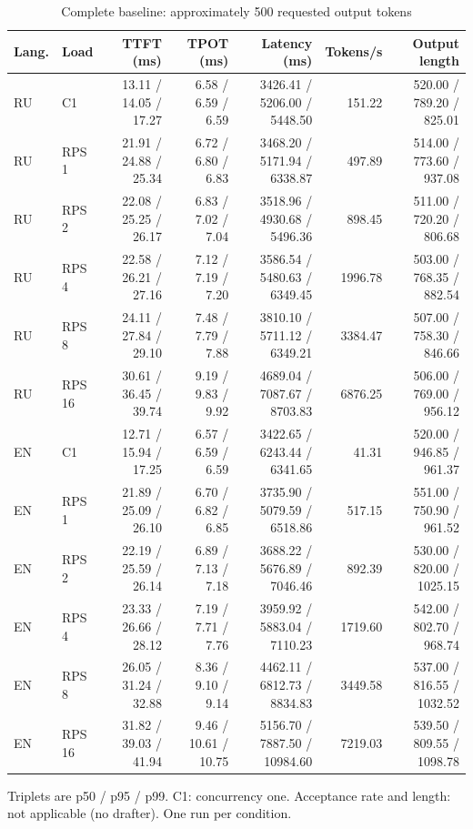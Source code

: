\begin{table}[htbp]
\centering
\caption{Complete baseline: approximately 500 requested output tokens}
\label{tab:full500}
\begin{singlespace}
\fontsize{10.5}{13}\selectfont
\setlength{\tabcolsep}{4pt}
\renewcommand{\arraystretch}{1.2}
\begin{tabular}{@{}llrrrrr@{}}
\toprule
Lang. & Load & TTFT (ms) & TPOT (ms) & Latency (ms) & Tokens/s & Output length \\
\midrule
RU & C1 & 13.11 / 14.05 / 17.27 & 6.58 / 6.59 / 6.59 & 3426.41 / 5206.00 / 5448.50 & 151.22 & 520.00 / 789.20 / 825.01 \\
RU & RPS 1 & 21.91 / 24.88 / 25.34 & 6.72 / 6.80 / 6.83 & 3468.20 / 5171.94 / 6338.87 & 497.89 & 514.00 / 773.60 / 937.08 \\
RU & RPS 2 & 22.08 / 25.25 / 26.17 & 6.83 / 7.02 / 7.04 & 3518.96 / 4930.68 / 5496.36 & 898.45 & 511.00 / 720.20 / 806.68 \\
RU & RPS 4 & 22.58 / 26.21 / 27.16 & 7.12 / 7.19 / 7.20 & 3586.54 / 5480.63 / 6349.45 & 1996.78 & 503.00 / 768.35 / 882.54 \\
RU & RPS 8 & 24.11 / 27.84 / 29.10 & 7.48 / 7.79 / 7.88 & 3810.10 / 5711.12 / 6349.21 & 3384.47 & 507.00 / 758.30 / 846.66 \\
RU & RPS 16 & 30.61 / 36.45 / 39.74 & 9.19 / 9.83 / 9.92 & 4689.04 / 7087.67 / 8703.83 & 6876.25 & 506.00 / 769.00 / 956.12 \\
EN & C1 & 12.71 / 15.94 / 17.25 & 6.57 / 6.59 / 6.59 & 3422.65 / 6243.44 / 6341.65 & 41.31 & 520.00 / 946.85 / 961.37 \\
EN & RPS 1 & 21.89 / 25.09 / 26.10 & 6.70 / 6.82 / 6.85 & 3735.90 / 5079.59 / 6518.86 & 517.15 & 551.00 / 750.90 / 961.52 \\
EN & RPS 2 & 22.19 / 25.59 / 26.14 & 6.89 / 7.13 / 7.18 & 3688.22 / 5676.89 / 7046.46 & 892.39 & 530.00 / 820.00 / 1025.15 \\
EN & RPS 4 & 23.33 / 26.66 / 28.12 & 7.19 / 7.71 / 7.76 & 3959.92 / 5883.04 / 7110.23 & 1719.60 & 542.00 / 802.70 / 968.74 \\
EN & RPS 8 & 26.05 / 31.24 / 32.88 & 8.36 / 9.10 / 9.14 & 4462.11 / 6812.73 / 8834.83 & 3449.58 & 537.00 / 816.55 / 1032.52 \\
EN & RPS 16 & 31.82 / 39.03 / 41.94 & 9.46 / 10.61 / 10.75 & 5156.70 / 7887.50 / 10984.60 & 7219.03 & 539.50 / 809.55 / 1098.78 \\
\bottomrule
\end{tabular}
\par\smallskip\raggedright Triplets are p50 / p95 / p99. C1: concurrency one. Acceptance rate and length: not applicable (no drafter). One run per condition.
\end{singlespace}
\end{table}
